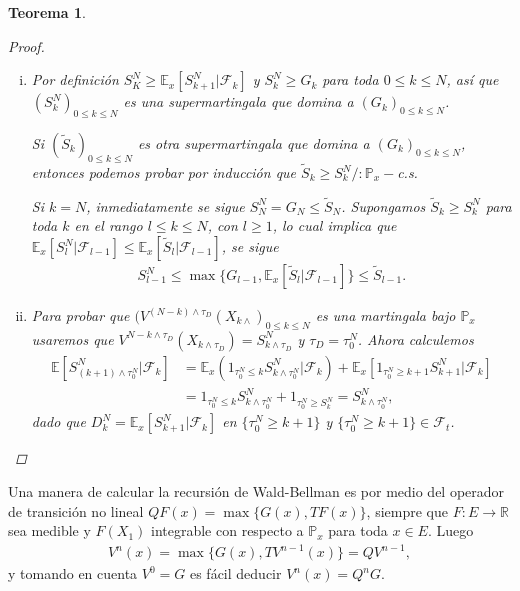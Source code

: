 \documentclass{article}
\newtheorem{teorema}[theorem]{Teorema}
\numberwithin{equation}{section}
\begin{document}
\begin{teorema}
\begin{proof}
\begin{enumerate}[(i)]
    \item Por definición $S_K^N \geq \mathbb{E}_x\left[S^N_{k+1} | \mathcal{F}_k\right]$ y $S^N_k \geq G_k$ para toda $0\leq k \leq N$, así que $(S^N_k)_{0\leq k \leq N}$ es una supermartingala que domina a $(G_k)_{0\leq k \leq N}$.

    Si $(\tilde{S}_k)_{0\leq k \leq N}$ es otra supermartingala que domina a $(G_k)_{0\leq k \leq N}$,  entonces podemos probar por inducción que $\tilde{S}_k \geq S_k^N /: \mathbb{P}_x-$c.s.

    Si $k=N$, inmediatamente se sigue $S^N_N = G_N \leq \tilde{S}_N$. Supongamos $\tilde{S}_k\geq S^N_k$ para toda $k$ en el rango $l\leq k \leq N$, con $l\geq 1$, lo cual implica que $\mathbb{E}_x\left[S^N_l | \mathcal{F}_{l-1}\right] \leq \mathbb{E}_x\left[\tilde{S}_l | \mathcal{F}_{l-1}\right]$, se sigue
    \begin{align*}
        S^N_{l-1}\leq \max\{G_{l-1}, \mathbb{E}_x\left[\tilde{S}_l | \mathcal{F}_{l-1}\right]\} \leq \tilde{S}_{l-1}.
    \end{align*}

    \item Para probar que $(V^{(N-k)\land \tau_D}(X_{k\land})_{0\leq k \leq N}$ es una martingala bajo $\mathbb{P}_x$ usaremos que $V^{N-k\land \tau_D}(X_{k\land \tau_D}) = S^{N}_{k\land \tau_D}$ y $\tau_D = \tau_0^N$. Ahora calculemos
    \begin{align*}
        \mathbb{E}\left[S^N_{(k+1)\land \tau_0^N} | \mathcal{F}_k\right] &= \mathbb{E}_x(1_{\tau_0^N\leq k}S^N_{k\land \tau_0^N} | \mathcal{F}_k) + \mathbb{E}_x\left[1_{\tau_0^N\geq k+1}S^N_{k+1} | \mathcal{F}_k\right]\\
        &= 1_{\tau_0^N\leq k}S^N_{k\land \tau_0^N} + 1_{\tau_0^N\geq S^N_k} = S^N_{k\land \tau_0^N},
    \end{align*}
    dado que $D_k^N = \mathbb{E}_x\left[S^N_{k+1} | \mathcal{F}_k\right]$ en $\{\tau_0^N \geq k+1\}$ y $\{\tau_0^N \geq k+1\} \in \mathcal{F}_t$.
\end{enumerate}

\end{proof}

\end{teorema}

Una manera de calcular la recursión de Wald-Bellman es por medio del operador de transición no lineal $QF(x) = \max\{G(x),TF(x)\}$, siempre que $F : E\to \mathbb{R}$ sea medible y $F(X_1)$ integrable con respecto a $\mathbb{P}_x$ para toda $x \in E$. Luego
\begin{align*}
    V^n(x) = \max\{G(x),TV^{n-1}(x)\} = QV^{n-1},
\end{align*}
y tomando en cuenta $V^0 = G$ es fácil deducir $V^n(x) = Q^nG$.
\end{document}
